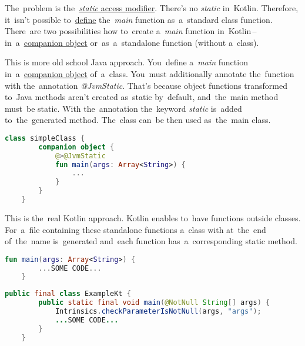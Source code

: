 \noindent The~problem is the~\hyperref[javastatic]{\textit{static} access modifier}.
There's no \textit{static} in~Kotlin.
Therefore, it~isn't possible to~\hyperref[declarationdefinition]{define} the~\textit{main} function as~a~standard class function.
There~are two possibilities how to~create a~\textit{main} function in~Kotlin\,--\,in~a~\hyperref[companionobject]{companion object} or~as~a~standalone function (without a~class).

This is more old school Java approach.
You~define a~\textit{main} function in~a~\hyperref[companionobject]{companion object} of~a~class.
You~must additionally annotate the~function with the~annotation \textit{@JvmStatic}.
That's because object functions transformed to~Java methods aren't created as~static by~default, and~the~main method must~be static.
With the~annotation the~keyword \textit{static} is~added to~the~generated method.
The~class can~be then used as~the~main class.

\begin{lstlisting}[language=Kotlin,title={Main function in~a~companion object}]
    class simpleClass {
        companion object {
            @>@JvmStatic
            fun main(args: Array<String>) {
                ...
            }
        }
    }
\end{lstlisting}

This is the~real Kotlin approach.
Kotlin enables to~have functions outside classes.
For~a~file containing these standalone functions a~class with  at~the~end of~the~name is~generated and~each function has~a~corresponding static method.


\begin{lstlisting}[language=Kotlin,title={A~tandalone main function in a~file \textit{Example.kt}}]
    fun main(args: Array<String>) {
        ...SOME CODE...
    }
\end{lstlisting}

\begin{lstlisting}[language=Java,title={Corresponding Java code}]
    public final class ExampleKt {
        public static final void main(@NotNull String[] args) {
            Intrinsics.checkParameterIsNotNull(args, "args");
            ...SOME CODE...
        }
    }
\end{lstlisting}
